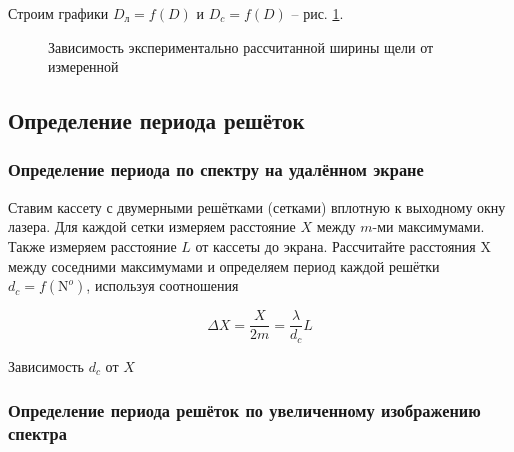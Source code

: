 \documentclass[a5paper,10pt, twoside]{article} %
\begin{document}
	Строим графики $D_{\text{л}} = f(D)$ и $D_c = f(D)$ -- рис. \ref{gr:1}.

	\begin{figure}[h!]\label{gr:1}
		\caption{Зависимость экспериментально рассчитанной ширины щели от измеренной }
	\end{figure}

\newpage
\subsection{Определение периода решёток}

\subsubsection{Определение периода по спектру на удалённом экране}

	Ставим кассету с двумерными решётками (сетками) вплотную к выходному окну лазера. Для каждой 
	сетки измеряем расстояние $X$ между $m$-ми максимумами. Также измеряем расстояние $L$ от кассеты 
	до экрана. Рассчитайте расстояния X между соседними максимумами и определяем период каждой решётки 
	$d_c = f(\text{N}^o)$, используя соотношения

	\begin{equation}
		\Delta X = \frac{X}{2m} = \frac{\lambda}{d_c} L
	\end{equation}

	\begin{table}[h]
		\caption{Зависимость $d_c$ от $X$}
	\end{table}


\subsubsection{Определение периода решёток по увеличенному изображению спектра}
\end{document}
